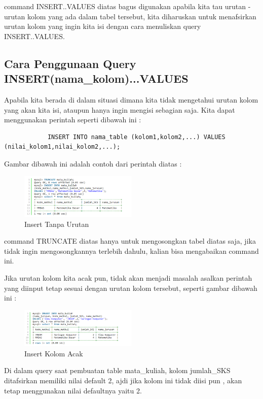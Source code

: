 	command INSERT..VALUES diatas bagus digunakan apabila kita tau urutan - urutan kolom yang ada dalam tabel tersebut, kita diharuskan untuk menafsirkan urutan kolom yang ingin kita isi dengan cara menuliskan query INSERT..VALUES.
	
	\subsection{Cara Penggunaan Query INSERT(nama_kolom)...VALUES}
	Apabila kita berada di dalam situasi dimana kita tidak mengetahui urutan kolom yang akan kita isi, ataupun hanya ingin mengisi sebagian saja. Kita dapat menggunakan perintah seperti dibawah ini :
		\begin{verbatim}
			INSERT INTO nama_table (kolom1,kolom2,...) VALUES (nilai_kolom1,nilai_kolom2,...);
		\end{verbatim}
		
	Gambar dibawah ini adalah contoh dari perintah diatas :
	
		\begin{figure}[ht]
			\centerline{\includegraphics[width=0.5\textwidth]{figures/insert3.png}}
			\caption{Insert Tanpa Urutan}
			\label{insert3}
			\end{figure}
			
	command TRUNCATE diatas hanya untuk mengosongkan tabel diatas saja, jika tidak ingin mengosongkannya terlebih dahulu, kalian bisa mengabaikan command ini.
	
	Jika urutan kolom kita acak pun, tidak akan menjadi masalah asalkan perintah yang diinput tetap sesuai dengan urutan kolom tersebut, seperti gambar dibawah ini :
	
		\begin{figure}[ht]
			\centerline{\includegraphics[width=0.5\textwidth]{figures/insert4.png}}
			\caption{Insert Kolom Acak}
			\label{insert4}
			\end{figure}
	
	Di dalam query saat pembuatan table mata_kuliah, kolom jumlah_SKS ditafsirkan memiliki nilai default 2, ajdi jika kolom ini tidak diisi pun , akan tetap menggunakan nilai defaultnya yaitu 2.
	
